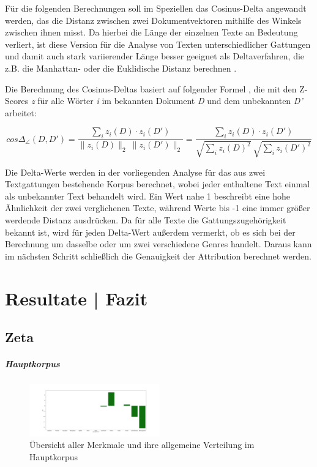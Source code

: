 \documentclass[a4paper,10p]{article}
\begin{document}
Für die folgenden Berechnungen soll im Speziellen das Cosinus-Delta angewandt werden, das die Distanz zwischen zwei Dokumentvektoren mithilfe des Winkels zwischen ihnen misst. Da hierbei die Länge der einzelnen Texte an Bedeutung verliert, ist diese Version für die Analyse von Texten unterschiedlicher Gattungen und damit auch stark variierender Länge besser geeignet als Deltaverfahren, die z.B. die Manhattan- oder die Euklidische Distanz berechnen \citep[vgl.][S. ii9]{Evert2017a}.\par 

Die Berechnung des Cosinus-Deltas basiert auf folgender Formel \citep[vgl.][S. ii6]{Evert2017a}, die mit den Z-Scores \textit{z} für alle Wörter \textit{i} im bekannten Dokument \textit{D} und dem unbekannten \textit{D’} arbeitet:\\


	 \begin{equ}[!h]
		\begin{equation}
		cos \Delta_\angle (D, D') = \frac{\sum_i z_i(D) \cdot z_i(D')}{\|z_i(D)\|_2 \ \|z_i(D')\|_2} = \frac{\sum_i z_i(D) \cdot z_i(D')}{\sqrt{\sum_i z_i(D)^2} \ \sqrt{\sum_i z_i(D')^2}}
		\end{equation}
	\end{equ}


Die Delta-Werte werden in der vorliegenden Analyse für das aus zwei Textgattungen bestehende Korpus berechnet, wobei jeder enthaltene Text einmal als unbekannter Text behandelt wird. Ein Wert nahe 1 beschreibt eine hohe Ähnlichkeit der zwei verglichenen Texte, während Werte bis -1 eine immer größer werdende Distanz ausdrücken. Da für alle Texte die Gattungszugehörigkeit  bekannt ist, wird für jeden Delta-Wert außerdem vermerkt, ob es sich bei der Berechnung um dasselbe oder um zwei verschiedene Genres handelt. Daraus kann im nächsten Schritt schließlich die Genauigkeit der Attribution berechnet werden.


\section{Resultate | Fazit}
\subsection{Zeta}
\subparagraph{Hauptkorpus} \quad \par 

\begin{figure}
	\includegraphics[width=0.5\textwidth]{haupt_alle_merkmale.png}
	\caption{Übersicht aller Merkmale und ihre allgemeine Verteilung im Hauptkorpus}
	\label{fig:haupt_alle_merkmale}
\end{figure}
\end{document}
